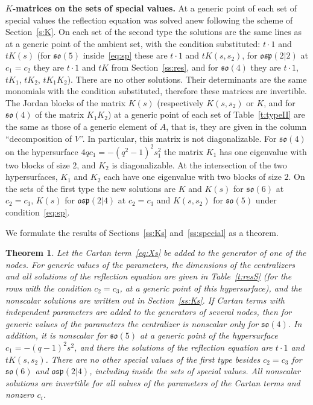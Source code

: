 \documentclass[12pt,a4paper]{article}
\newtheorem{theorem}{Theorem}
\newcommand{\so}{\mathfrak{so}}
\newcommand{\osp}{\mathfrak{osp}}
\begin{document}
\textbf{$K$-matrices on the sets of special values.} At a generic point of each set of special values the reflection
equation was solved anew following the scheme of Section~\ref{s:K}. On each set of the second type the solutions are the same lines as at
a generic point of the ambient set, with the condition substituted: $t\cdot1$ and $tK(s)$ (for $\so(5)$ inside~\eqref{eq:sp}
these are $t\cdot1$ and $tK(s,s_2)$, for $\osp(2|2)$ at $c_1=c_2$ they are $t\cdot1$ and $tK$ from Section~\ref{ss:res}, and for $\so(4)$ they are $t\cdot1$, $tK_1$, $tK_2$,
$tK_1K_2$). There are no other solutions. Their determinants are the same monomials with the condition substituted, therefore these matrices
are invertible. The Jordan blocks of the matrix $K(s)$ (respectively $K(s,s_2)$ or $K$, and for $\so(4)$ of the matrix $K_1K_2$) at
a generic point of each set of Table~\ref{t:typeII} are the same as those of a generic element of $A$, that is, they are given in the column
``decomposition of $V$''. In particular, this matrix is not diagonalizable. For $\so(4)$ on the hypersurface
$4qc_1=-(q^2-1)^2s_1^2$ the matrix $K_1$ has one eigenvalue with two blocks of size $2$, and $K_2$
is diagonalizable. At the intersection of the two hypersurfaces, $K_1$ and $K_2$ each have one eigenvalue with two
blocks of size $2$. On the sets of the first type the new solutions are $K$ and $K(s)$ for $\so(6)$ at $c_2=c_3$,
$K(s)$ for $\osp(2|4)$ at $c_2=c_3$ and $K(s,s_2)$ for $\so(5)$ under condition~\eqref{eq:sp}.

We formulate the results of Sections~\ref{ss:Ks} and~\ref{ss:special} as a theorem.

\begin{theorem}\label{th:cartan}
Let the Cartan term~\eqref{eq:Xs} be added to the generator of one of the nodes. For generic values of the
parameters, the dimensions of the centralizers and all solutions of the reflection equation are given in Table~\ref{t:resS} (for the rows with
the condition $c_2=c_3$, at a generic point of this hypersurface), and the
nonscalar solutions are written out in Section~\ref{ss:Ks}. If Cartan terms with independent parameters are added to the
generators of several nodes, then for generic values of the parameters the centralizer is nonscalar only for $\so(4)$. In addition, it is nonscalar for $\so(5)$ at a generic point of the hypersurface
$c_1=-(q-1)^2s^2$, and there the solutions of the reflection equation are $t\cdot1$ and $tK(s,s_2)$. There are no other special
values of the first type besides $c_2=c_3$ for $\so(6)$ and $\osp(2|4)$, including inside the sets of special values. All nonscalar solutions are invertible for all values of the parameters of the Cartan terms and nonzero $c_i$.
\end{theorem}
\end{document}
